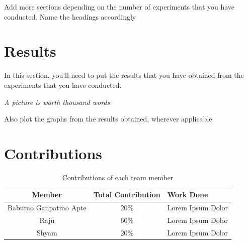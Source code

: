 \documentclass[11pt,swedish, openany]{book}
\begin{document}
Add more sections depending on the number of experiments that you have 
conducted. Name the headings accordingly

\chapter {Results}
In this section, you'll need to put the results that you have obtained from the experiments that you have conducted.

\begin{center}
        \emph{A picture is worth thousand words}
\end{center}

Also plot the graphs from the results obtained, wherever applicable.


\chapter{Contributions}
{\renewcommand{\arraystretch}{1.2}  %
\begin{table}[h]
    \centering
    \begin{tabular}{|c|c|p{6cm}|}
        \hline
        
        \textbf{Member} & \textbf{Total Contribution} & \textbf{Work Done} \\
        
        \hline
        \hline
        
         Baburao Ganpatrao Apte        &
         20\%                          & 
         Lorem Ipsum Dolor        \\
        
         \hline
         
         
         Raju           &  
         60\%           &      
         Lorem Ipsum Dolor \\
         
         \hline
         
         Shyam         & 
         20\%          & 
         Lorem Ipsum Dolor \\
         
         
         \hline

    \end{tabular}
    \caption{Contributions of each team member}
    \label{tab:contrib}
\end{table}}




\pagebreak




\end{document}
